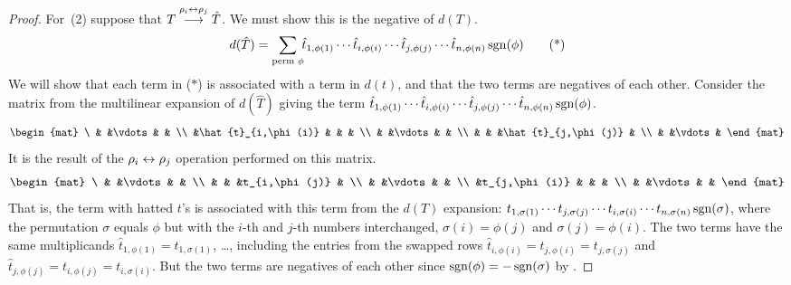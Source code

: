 \begin{proof}
For~(2) suppose that 
\( T\;\smash[b]{\mathrel{ \mathop{\longrightarrow}\limits^{\rho_i\leftrightarrow\rho_j\mathstrut}_{ \begin{subarray}{l} \relax \end{subarray}}}}\;\hat{T} \).
We must show this is the negative of $d(T)$.
\begin{equation*}
  d(\hat{T})=
  \sum_{\text{perm\ }\phi}\!\!
    \hat{t}_{1,\phi(1)}
    \cdots\hat{t}_{i,\phi(i)}
    \cdots\hat{t}_{j,\phi(j)}
    \cdots \hat{t}_{n,\phi(n)}
                                 \operatorname{sgn}(\phi)
    \tag{*}
\end{equation*}
We will show that each term in ($*$) is associated with a term in $d(t)$, 
and that the two terms are negatives of each other.
Consider the matrix from the multilinear expansion 
of $d(\hat{T})$ giving the term  
    $\hat{t}_{1,\phi(1)}
    \cdots\hat{t}_{i,\phi(i)}
    \cdots\hat{t}_{j,\phi(j)}
    \cdots \hat{t}_{n,\phi(n)}
                                 \operatorname{sgn}(\phi)$.
\begin{equation*}
  \begin{mat}
     \ &                  &\vdots &               &     \\
       &\hat{t}_{i,\phi(i)}  &       &               &    \\
       &                &\vdots &                 &  \\
       &                &       &\hat{t}_{j,\phi(j)} &  \\
       &                &\vdots                   &
  \end{mat}
\end{equation*}
It is the result of the $\rho_i\leftrightarrow\rho_j$ operation performed on this
matrix.
\begin{equation*}
  \begin{mat}
       \ &              &\vdots &           &        \\
         &              &       &t_{i,\phi(j)} &  \\
         &              &\vdots &           &       \\
         &t_{j,\phi(i)}    &       &          &        \\
         &              &\vdots &          &
  \end{mat}
\end{equation*}
That is, the term with hatted $t$'s is associated with 
this term from the $d(T)$ expansion:
 \(    t_{1,\sigma(1)}
       \cdots t_{j,\sigma(j)}
       \cdots t_{i,\sigma(i)}
       \cdots t_{n,\sigma(n)} \operatorname{sgn}(\sigma)
       \), where the permutation
\( \sigma \) 
equals \( \phi \) but with the
\( i \)-th and \( j \)-th numbers interchanged,
\( \sigma(i)=\phi(j) \) and \( \sigma(j)=\phi(i) \).
The two terms have the same multiplicands
$\hat{t}_{1,\phi(1)}=t_{1,\sigma(1)}$, \ldots, 
including the entries from the swapped rows
$\hat{t}_{i,\phi(i)}=t_{j,\phi(i)}=t_{j,\sigma(j)}$
and $\hat{t}_{j,\phi(j)}=t_{i,\phi(j)}=t_{i,\sigma(i)}$. 
But the two terms are negatives of each other
since \( \operatorname{sgn}(\phi)=-\operatorname{sgn}(\sigma) \) by .


\end{proof}
